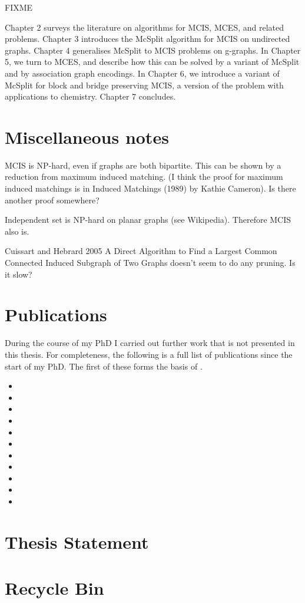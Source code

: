 FIXME

Chapter 2 surveys the literature on algorithms for MCIS, MCES, and related
problems. Chapter 3 introduces the McSplit algorithm for MCIS on undirected
graphs. Chapter 4 generalises McSplit to MCIS problems on g-graphs. In Chapter
5, we turn to MCES, and describe how this can be solved by a variant of McSplit
and by association graph encodings. In Chapter 6, we introduce a variant of
McSplit for block and bridge preserving MCIS, a version of the problem with
applications to chemistry. Chapter 7 concludes.

\section{Miscellaneous notes}

MCIS is NP-hard, even if graphs are both bipartite.  This can be shown by a
reduction from maximum induced matching.  (I think the proof for maximum induced
matchings is in Induced Matchings (1989) by Kathie Cameron). Is there another
proof somewhere?

Independent set is NP-hard on planar graphs (see Wikipedia).  Therefore
MCIS also is.

Cuissart and Hebrard 2005 A Direct Algorithm to Find a Largest Common
Connected Induced Subgraph of Two Graphs doesn't seem to do any
pruning.  Is it slow?

\section{Publications}

During the course of my PhD I carried out further work
that is not presented in this thesis.
For completeness, the following is a full list of publications
since the start of my PhD.  The first of these
forms the basis of .

\begin{itemize}
    \item{}
    \item{}
    \item{}
    \item{}
    \item{}
    \item{}
    \item{}
    \item{}
    \item{}
    \item{}
    \item{}
\end{itemize}

\section{Thesis Statement}
\label{c:intro:thesisstatement}

\section{Recycle Bin}



